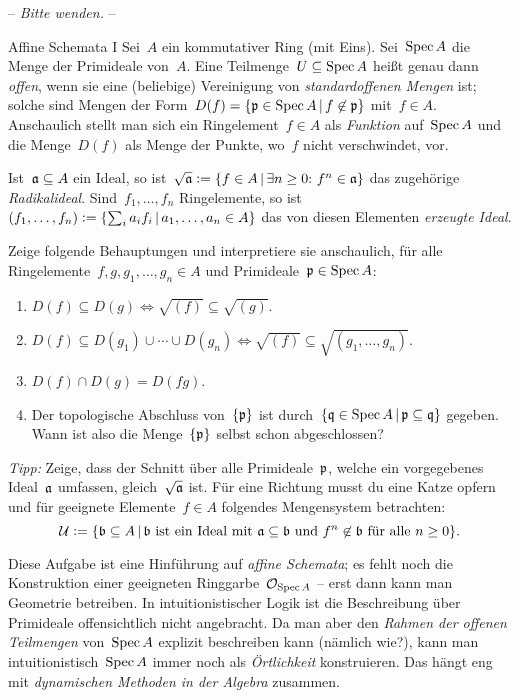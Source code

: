 \documentclass{uebblatt}
\begin{document}
\begin{center}-- \emph{Bitte wenden.} --\end{center}

\newpage

\begin{aufgabe}{Affine Schemata I}
Sei~$A$ ein kommutativer Ring (mit Eins). Sei~$\operatorname{Spec} A$ die Menge der Primideale
von~$A$. Eine Teilmenge~$U \subseteq \operatorname{Spec} A$ heißt genau dann \emph{offen},
wenn sie eine (beliebige) Vereinigung von \emph{standardoffenen Mengen}
ist; solche sind Mengen der Form~$D(f) = \{ \mathfrak{p} \in \operatorname{Spec} A \,|\, f \not\in
\mathfrak{p} \}$ mit~$f \in A$. Anschaulich stellt man sich ein Ringelement~$f \in A$
als \emph{Funktion} auf~$\operatorname{Spec} A$ und die Menge~$D(f)$ als Menge der Punkte,
wo~$f$ nicht verschwindet, vor.

Ist~$\mathfrak{a} \subseteq A$ ein Ideal, so ist~$\sqrt{\mathfrak{a}} \vcentcolon= \{ f \in A \,|\,
\exists n \geq 0{:}\ f^n \in \mathfrak{a} \}$ das zugehörige \emph{Radikalideal}.
Sind~$f_1,\ldots,f_n$ Ringelemente, so ist~$(f_1,\ldots,f_n) \vcentcolon= \{ \sum_i a_i
f_i \,|\, a_1,\ldots,a_n \in A \}$ das von diesen Elementen \emph{erzeugte
Ideal}.

Zeige folgende Behauptungen und interpretiere sie anschaulich, für alle
Ringelemente~$f,g,g_1,\ldots,g_n \in A$ und Primideale~$\mathfrak{p} \in \operatorname{Spec} A$:
\begin{enumerate}
\item $D(f) \subseteq D(g) \Longleftrightarrow \sqrt{(f)} \subseteq
\sqrt{(g)}$.
\item $D(f) \subseteq D(g_1) \cup \cdots \cup D(g_n) \Longleftrightarrow
\sqrt{(f)} \subseteq \sqrt{(g_1,\ldots,g_n)}$.
\item $D(f) \cap D(g) = D(fg)$.
\item Der topologische Abschluss von~$\{\mathfrak{p}\}$ ist
durch~$\{ \mathfrak{q} \in \operatorname{Spec} A \,|\, \mathfrak{p} \subseteq \mathfrak{q} \}$ gegeben.
Wann ist also die Menge~$\{\mathfrak{p}\}$ selbst schon abgeschlossen?
\end{enumerate}

\emph{Tipp:} Zeige, dass der Schnitt über alle Primideale~$\mathfrak{p}$, welche ein
vorgegebenes Ideal~$\mathfrak{a}$ umfassen, gleich~$\sqrt{\mathfrak{a}}$ ist. Für eine Richtung
musst du eine Katze opfern und für geeignete Elemente~$f \in A$
folgendes Mengensystem betrachten:
\[ \mathcal{U} \vcentcolon= \{ \mathfrak{b} \subseteq A \,|\, \text{$\mathfrak{b}$ ist ein Ideal mit $\mathfrak{a}
\subseteq \mathfrak{b}$ und~$f^n \not\in \mathfrak{b}$ für alle~$n \geq 0$} \}. \]

Diese Aufgabe ist eine Hinführung auf \emph{affine Schemata}; es fehlt noch
die Konstruktion einer geeigneten Ringgarbe~$\mathcal{O}_{\operatorname{Spec} A}$ -- erst dann kann
man Geometrie betreiben.
In intuitionistischer Logik ist die Beschreibung über
Primideale offensichtlich nicht angebracht. Da man aber den \emph{Rahmen der
offenen Teilmengen} von~$\operatorname{Spec} A$ explizit beschreiben kann (nämlich wie?),
kann man intuitionistisch~$\operatorname{Spec} A$ immer noch als \emph{Örtlichkeit}
konstruieren. Das hängt eng mit \emph{dynamischen Methoden in der Algebra}
zusammen.
\end{aufgabe}
\enlargethispage{2em}
\end{document}
